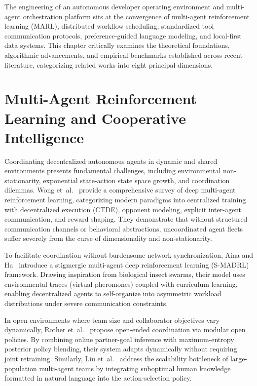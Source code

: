 \documentclass[12pt,a4paper]{report}
\begin{document}
The engineering of an autonomous developer operating environment and multi-agent orchestration platform sits at the convergence of multi-agent reinforcement learning (MARL), distributed workflow scheduling, standardized tool communication protocols, preference-guided language modeling, and local-first data systems. This chapter critically examines the theoretical foundations, algorithmic advancements, and empirical benchmarks established across recent literature, categorizing related works into eight principal dimensions.

\section{Multi-Agent Reinforcement Learning and Cooperative Intelligence}
Coordinating decentralized autonomous agents in dynamic and shared environments presents fundamental challenges, including environmental non-stationarity, exponential state-action state space growth, and coordination dilemmas. Wong et~al.~\cite{ref_wong2023_marlsurvey} provide a comprehensive survey of deep multi-agent reinforcement learning, categorizing modern paradigms into centralized training with decentralized execution (CTDE), opponent modeling, explicit inter-agent communication, and reward shaping. They demonstrate that without structured communication channels or behavioral abstractions, uncoordinated agent fleets suffer severely from the curse of dimensionality and non-stationarity.

To facilitate coordination without burdensome network synchronization, Aina and Ha~\cite{ref_aina2026_smadrl} introduce a stigmergic multi-agent deep reinforcement learning (S-MADRL) framework. Drawing inspiration from biological insect swarms, their model uses environmental traces (virtual pheromones) coupled with curriculum learning, enabling decentralized agents to self-organize into asymmetric workload distributions under severe communication constraints.

In open environments where team size and collaborator objectives vary dynamically, Rother et~al.~\cite{ref_rother2025_openended} propose open-ended coordination via modular open policies. By combining online partner-goal inference with maximum-entropy posterior policy blending, their system adapts dynamically without requiring joint retraining. Similarly, Liu et~al.~\cite{ref_liu2026_humanknowledge} address the scalability bottleneck of large-population multi-agent teams by integrating suboptimal human knowledge formatted in natural language into the action-selection policy.
\end{document}
